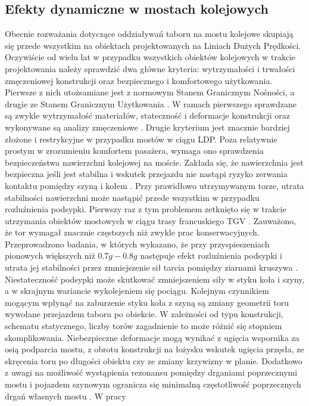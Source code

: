 

\subsection{Efekty dynamiczne w mostach kolejowych} \label{sect:railway_dynamic_effects}
Obecnie rozważania dotyczące oddziaływań taboru na mostu kolejowe skupiają się przede wszystkim na obiektach projektowanych na Liniach Dużych Prędkości. Oczywiście od wielu lat w przypadku wszystkich obiektów kolejowych w trakcie projektowania należy sprawdzić dwa główne kryteria: wytrzymałości i trwałości zmęczeniowej konstrukcji oraz bezpiecznego i komfortowego użytkowania. Pierwsze z nich utożsamiane jest z normowym Stanem Granicznym Nośności, a drugie ze Stanem Granicznym Użytkowania \parencite{PKNc}. W ramach pierwszego sprawdzane są zwykle wytrzymałość materiałów, stateczność i deformacje konstrukcji oraz wykonywane są analizy zmęczeniowe \parencite{Ladislav2008}. Drugie kryterium jest znacznie bardziej złożone i restrykcyjne w przypadku mostów w ciągu LDP. Poza relatywnie prostym w zrozumieniu komfortem pasażera, wymaga ono sprawdzenia bezpieczeństwa nawierzchni kolejowej na moście. Zakłada się, że nawierzchnia jest bezpieczna jeśli jest stabilna i wskutek przejazdu nie nastąpi ryzyko zerwania kontaktu pomiędzy szyną i kołem \parencite{Ramondenc2008}. Przy prawidłowo utrzymywanym torze, utrata stabilności nawierzchni może nastąpić przede wszystkim w przypadku rozluźnienia podsypki. Pierwszy raz z tym problemem zetknięto się w trakcie utrzymania obiektów mostowych w ciągu trasy francuskiego TGV \parencite{Ramondenc1998}. Zauważono, że tor wymagał znacznie częstszych niż zwykle prac konserwacyjnych. Przeprowadzono badania, w których wykazano, że przy przyspieszeniach pionowych większych niż $0.7g-0.8g$ następuje efekt rozluźnienia podsypki i utrata jej stabilności przez zmniejszenie sił tarcia pomiędzy ziarnami kruszywa \parencite{Zacher2008}. Niestateczność podsypki może skutkować zmniejszeniem siły w styku koła i szyny, a w skrajnym wariancie wykolejeniem się pociągu. Kolejnym czynnikiem mogącym wpłynąć na zaburzenie styku koła z szyną są zmiany geometrii toru wywołane przejazdem taboru po obiekcie. W zależności od typu konstrukcji, schematu statycznego, liczby torów zagadnienie to może różnić się stopniem skomplikowania. Niebezpieczne deformacje mogą wynikać z ugięcia wspornika za osią podparcia mostu, z obrotu konstrukcji na łożysku wskutek ugięcia przęsła, ze skręcenia toru po długości obiektu czy ze zmiany krzywizny w planie. Dodatkowo z uwagi na możliwość wystąpienia rezonansu pomiędzy drganiami poprzecznymi mostu i pojazdem szynowym ogranicza się minimalną częstotliwość poprzecznych drgań własnych mostu \parencite{Goicolea2003,Dias2007,Dias2008}. W pracy 
